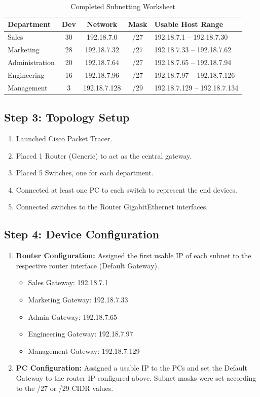 \documentclass[a4paper,12pt]{article}
\begin{document}
\begin{table}[H]
\centering
\begin{tabular}{|l|c|c|c|l|}
\hline
\textbf{Department} & \textbf{Dev} & \textbf{Network} & \textbf{Mask} & \textbf{Usable Host Range} \\ \hline
Sales & 30 & 192.18.7.0 & /27 & 192.18.7.1 -- 192.18.7.30 \\ \hline
Marketing & 28 & 192.18.7.32 & /27 & 192.18.7.33 -- 192.18.7.62\\ \hline
Administration & 20 & 192.18.7.64 & /27 & 192.18.7.65 -- 192.18.7.94 \\ \hline
Engineering & 16 & 192.18.7.96 & /27 & 192.18.7.97 -- 192.18.7.126 \\ \hline
Management & 3 & 192.18.7.128 & /29 & 192.18.7.129 -- 192.18.7.134 \\ \hline
\end{tabular}
\caption{Completed Subnetting Worksheet}
\end{table}

\subsection{Step 3: Topology Setup}
\begin{enumerate}
    \item Launched Cisco Packet Tracer.
    \item Placed 1 Router (Generic) to act as the central gateway.
    \item Placed 5 Switches, one for each department.
    \item Connected at least one PC to each switch to represent the end devices.
    \item Connected switches to the Router GigabitEthernet interfaces.
\end{enumerate}

\subsection{Step 4: Device Configuration}
\begin{enumerate}
    \item \textbf{Router Configuration:} Assigned the first usable IP of each subnet to the respective router interface (Default Gateway).
    \begin{itemize}
        \item Sales Gateway: 192.18.7.1
        \item Marketing Gateway: 192.18.7.33
        \item Admin Gateway: 192.18.7.65
        \item Engineering Gateway: 192.18.7.97
        \item Management Gateway: 192.18.7.129
    \end{itemize}
    \item \textbf{PC Configuration:} Assigned a usable IP to the PCs and set the Default Gateway to the router IP configured above. Subnet masks were set according to the  /27 or /29 CIDR values.
\end{enumerate}
\end{document}
